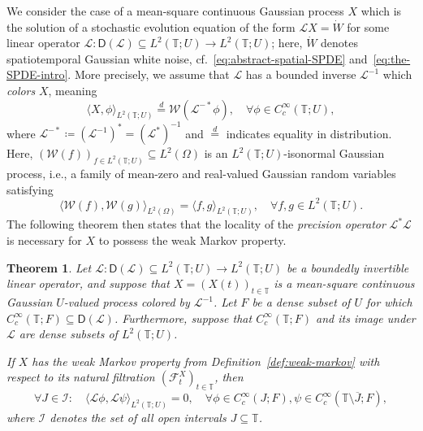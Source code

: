 \documentclass[reqno]{amsart}
\numberwithin{equation}{section}
\newcommand{\bbT}{\mathbb{T}}
\newcommand{\cF}{\mathcal{F}}
\newcommand{\cL}{\mathcal{L}}
\newcommand{\scalar}[2]{     \langle #1       \rangle_{ #2 }}
\newcommand{\from}{\colon}
\newcommand{\clos}[1]{\overline{ #1 }}
\newcommand{\dom}[1]{\mathsf D(#1)}
\newtheorem{theorem}[lemma]{Theorem}
\theoremstyle{remark}
\theoremstyle{definition}
\begin{document}
We consider the case of a mean-square continuous Gaussian process $X$
which
is the solution of a stochastic evolution equation of the form
$\cL X = \dot W$ for some linear operator $\cL \from \dom{\cL} \subseteq L^2(\bbT; U) \to L^2(\bbT; U)$;
here, $\dot W$ denotes spatiotemporal Gaussian white noise, 
cf.~\eqref{eq:abstract-spatial-SPDE} and~\eqref{eq:the-SPDE-intro}.
More precisely, we assume that $\cL$ has a bounded inverse $\cL^{-1}$ 
which \emph{colors} $X$, meaning
%
\begin{equation}\label{eq:X-colored-by-Linverse}
	\langle X, \phi \rangle_{L^2(\bbT; U)} \overset{d}{=} \mathscr W(\cL^{-*} \phi), 
	\quad 
	\forall 
	\phi \in C_c^\infty(\bbT; U),
\end{equation}
%
where $\cL^{-*} \coloneqq (\cL^{-1})^* = (\cL^*)^{-1}$ and $\overset{d}{=}$ indicates equality in distribution.
Here, $(\mathscr W(f))_{f \in L^2(\bbT; U)} \subseteq L^2(\Omega)$ is an $L^2(\bbT; U)$-isonormal Gaussian process,
i.e., a family of mean-zero and real-valued Gaussian random variables satisfying
%
\begin{equation}
	\scalar{\mathscr W(f), \mathscr W(g)}{L^2(\Omega)}
	=
	\scalar{f, g}{L^2(\bbT; U)},
	\quad 
	\forall f, g \in L^2(\bbT;U). \label{eq:isonormal}
\end{equation}
%
The following theorem then states that the locality of the
\emph{precision operator} $\cL^* \cL$ is necessary for
$X$ to possess the weak Markov property.
%
\begin{theorem}\label{thm:weakMarkov-Gaussian-necessity}
	Let $\cL \from \dom{\cL} \subseteq L^2(\bbT; U) \to L^2(\bbT; U)$ be a
	boundedly invertible linear
	operator,
	and suppose that $X = (X(t))_{t\in\bbT}$ is a mean-square continuous Gaussian $U$-valued process
	colored by $\cL^{-1}$.
	Let $F$ be a dense subset of $U$ for which
	$C_c^\infty(\bbT; F) \subseteq \dom{\cL}$.
	Furthermore, suppose that
	$C_c^\infty(\bbT; F)$ and its image under $\cL$ are dense
	subsets of
	$L^2(\bbT; U)$.
	
	If $X$ has the weak Markov property from Definition~\ref{def:weak-markov} with respect
	to its natural filtration $(\cF_t^X)_{t\in\bbT}$, then
	\begin{equation}\label{eq:precision-operator-local}
		\forall J \in \mathscr I : \quad 
		\langle \cL \phi, \cL \psi \rangle_{L^2(\bbT; U)} = 0,
		\quad 
		\forall
		\phi \in C_c^\infty(J; F), \psi \in C_c^\infty(\bbT \setminus \clos J; F),
	\end{equation}
	where $\mathscr I$ denotes the set of 
	all open intervals $J \subseteq \bbT$.
\end{theorem}
\end{document}
